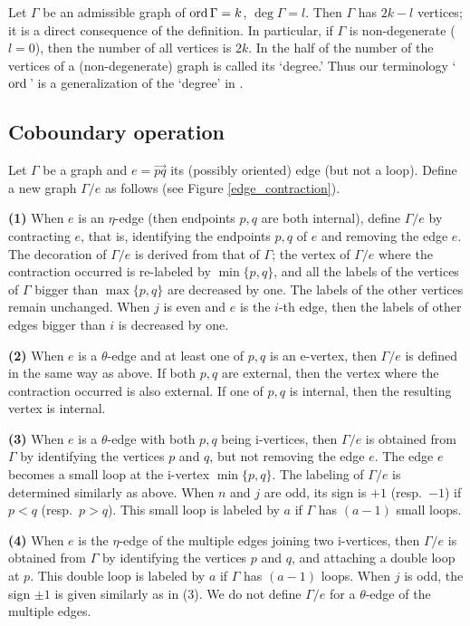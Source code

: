 \begin{rem}\label{number_of_vertices}
Let $\Gamma$ be an admissible graph of $\mathrm{ord}\, \Gamma =k$, $\deg \Gamma =l$.
Then $\Gamma$ has $2k-l$ vertices; it is a direct consequence of the definition.
In particular, if $\Gamma$ is non-degenerate ($l=0$), then the number of all vertices is $2k$.
In \cite{Watanabe07} the half of the number of the vertices of a (non-degenerate) graph is called its `degree.'
Thus our terminology `$\mathrm{ord}\,$' is a generalization of the `degree' in \cite{Watanabe07}.
\end{rem}





\subsection{Coboundary operation}\label{subsection_coboundary}





\begin{defn}
Let $\Gamma$ be a graph and $e = \overrightarrow{pq}$ its (possibly oriented) edge (but not a loop).
Define a new graph $\Gamma / e$ as follows (see Figure \ref{edge_contraction}).


{\bf (1)} When $e$ is an $\eta$-edge (then endpoints $p,q$ are both internal), define $\Gamma / e$ by contracting $e$,
that is, identifying the endpoints $p,q$ of $e$ and removing the edge $e$.
The decoration of $\Gamma /e$ is derived from that of $\Gamma$; the vertex of $\Gamma / e$ where the contraction
occurred is re-labeled by $\min \{ p,q \}$, and all the labels of the vertices of $\Gamma$ bigger than $\max \{ p,q\}$
are decreased by one.
The labels of the other vertices remain unchanged.
When $j$ is even and $e$ is the $i$-th edge, then the labels of other edges bigger than $i$ is decreased by one.


{\bf (2)} When $e$ is a $\theta$-edge and at least one of $p,q$ is an e-vertex, then $\Gamma / e$ is defined in the same
way as above.
If both $p,q$ are external, then the vertex where the contraction occurred is also external.
If one of $p,q$ is internal, then the resulting vertex is internal.


{\bf (3)} When $e$ is a $\theta$-edge with both $p,q$ being i-vertices, then $\Gamma / e$ is obtained from $\Gamma$ by
identifying the vertices $p$ and $q$, but not removing the edge $e$.
The edge $e$ becomes a small loop at the i-vertex $\min \{ p,q\}$.
The labeling of $\Gamma / e$ is determined similarly as above.
When $n$ and $j$ are odd, its sign is $+1$ (resp.\ $-1$) if $p<q$ (resp.\ $p>q$).
This small loop is labeled by $a$ if $\Gamma$ has $(a-1)$ small loops.


{\bf (4)} When $e$ is the $\eta$-edge of the multiple edges joining two i-vertices, then $\Gamma / e$ is obtained from
$\Gamma$ by identifying the vertices $p$ and $q$, and attaching a double loop at $p$.
This double loop is labeled by $a$ if $\Gamma$ has $(a-1)$ loops.
When $j$ is odd, the sign $\pm 1$ is given similarly as in (3).
We do not define $\Gamma /e$ for a $\theta$-edge of the multiple edges.
\end{defn}



